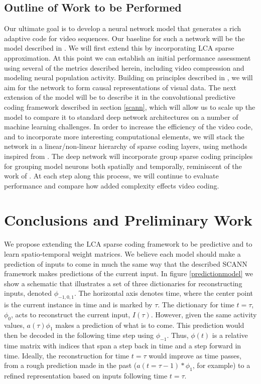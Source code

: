 \documentclass[smallextended]{svjour3}       %
\begin{document}
\subsection{Outline of Work to be Performed}
\noindent Our ultimate goal is to develop a neural network model that generates a rich adaptive code for video sequences. Our baseline for such a network will be the model described in \cite{olshausen2003learning}. We will first extend this by incorporating LCA sparse approximation. At this point we can establish an initial performance assessment using several of the metrics described herein, including video compression and modeling neural population activity. Building on principles described in \cite{charles2011causal}, we will aim for the network to form causal representations of visual data. The next extension of the model will be to describe it in the convolutional predictive coding framework described in section \ref{scann}, which will allow us to scale up the model to compare it to standard deep network architectures on a number of machine learning challenges. In order to increase the efficiency of the video code, and to incorporate more interesting computational elements, we will stack the network in a linear/non-linear hierarchy of sparse coding layers, using methods inspired from \cite{paiton2015deconvolutional,cadieu2008learning,le2013building}. The deep network will incorporate group sparse coding principles for grouping model neurons both spatially and temporally, reminiscent of the work of \cite{le2013building,hyvarinen2003bubbles,karklin2005hierarchical}. At each step along this process, we will continue to evaluate performance and compare how added complexity effects video coding.

\section{Conclusions and Preliminary Work}
\noindent We propose extending the LCA sparse coding framework to be predictive and to learn spatio-temporal weight matrices. We believe each model should make a prediction of inputs to come in much the same way that the described SCANN framework makes predictions of the current input. In figure \ref{predictionmodel} we show a schematic that illustrates a set of three dictionaries for reconstructing inputs, denoted $\phi_{-1,0,1}$. The horizontal axis denotes time, where the center point is the current instance in time and is marked by $\tau$. The dictionary for time $t=\tau$, $\phi_{0}$, acts to reconstruct the current input, $I(\tau)$. However, given the same activity values, $a(\tau)\phi_{1}$ makes a prediction of what is to come. This prediction would then be decoded in the following time step using $\phi_{-1}$. Thus, $\phi(t)$ is a relative time matrix with indices that span a step back in time and a step forward in time. Ideally, the reconstruction for time $t=\tau$ would improve as time passes, from a rough prediction made in the past ($a(t=\tau-1)*\phi_{1}$, for example) to a refined representation based on inputs following time $t=\tau$.\\
\end{document}
